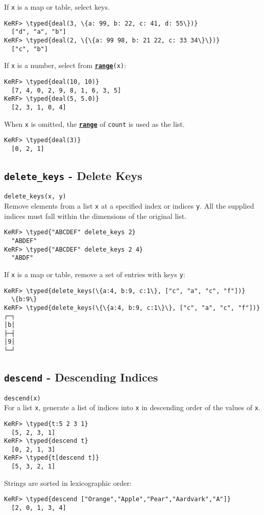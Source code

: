 \documentclass{article}
\newcommand{\typed}[1]{\textcolor{TealBlue}{#1}}
\newcommand{\primdefu}[3]{\subsection{\texttt{#1} - #2}\label{prim:#3}}
\newcommand{\primu}[2]{\hyperref[prim:#2]{\textbf{\texttt{#1}}}}
\newcommand{\primdef}[2]{\primdefu{#1}{#2}{#1}}
\newcommand{\prim}[1]{\primu{#1}{#1}}
\begin{document}
If \texttt{x} is a map or table, select keys.
\begin{Verbatim}
KeRF> \typed{deal(3, \{a: 99, b: 22, c: 41, d: 55\})}
  ["d", "a", "b"]
KeRF> \typed{deal(2, \{\{a: 99 98, b: 21 22, c: 33 34\}\})}
  ["c", "b"]
\end{Verbatim}

If \texttt{x} is a number, select from \prim{range}\texttt{(x)}:
\begin{Verbatim}
KeRF> \typed{deal(10, 10)}
  [7, 4, 0, 2, 9, 8, 1, 6, 3, 5]
KeRF> \typed{deal(5, 5.0)}
  [2, 3, 1, 0, 4]
\end{Verbatim}

When \texttt{x} is omitted, the \prim{range} of \texttt{count} is used as the list.
\begin{Verbatim}
KeRF> \typed{deal(3)}
  [0, 2, 1]
\end{Verbatim}

\pagebreak
\primdefu{delete\_keys}{Delete Keys}{deleteKeys}
\texttt{delete\_keys(x, y)}\\

Remove elements from a list \texttt{x} at a specified index or indices \texttt{y}. All the supplied indices must fall within the dimensions of the original list.
\begin{Verbatim}
KeRF> \typed{"ABCDEF" delete_keys 2}
  "ABDEF"
KeRF> \typed{"ABCDEF" delete_keys 2 4}
  "ABDF"
\end{Verbatim}

If \texttt{x} is a map or table, remove a set of entries with keys \texttt{y}:
\begin{Verbatim}
KeRF> \typed{delete_keys(\{a:4, b:9, c:1\}, ["c", "a", "c", "f"])}
  \{b:9\}
KeRF> \typed{delete_keys(\{\{a:4, b:9, c:1\}\}, ["c", "a", "c", "f"])}
┌─┐
│b│
├─┤
│9│
└─┘
\end{Verbatim}

\primdef{descend}{Descending Indices}
\texttt{descend(x)}\\

For a list \texttt{x}, generate a list of indices into \texttt{x} in descending order of the values of \texttt{x}.

\begin{Verbatim}
KeRF> \typed{t:5 2 3 1}
  [5, 2, 3, 1]
KeRF> \typed{descend t}
  [0, 2, 1, 3]
KeRF> \typed{t[descend t]}
  [5, 3, 2, 1]
\end{Verbatim}

Strings are sorted in lexicographic order:
\begin{Verbatim}
KeRF> \typed{descend ["Orange","Apple","Pear","Aardvark","A"]}
  [2, 0, 1, 3, 4]
\end{Verbatim}
\end{document}
